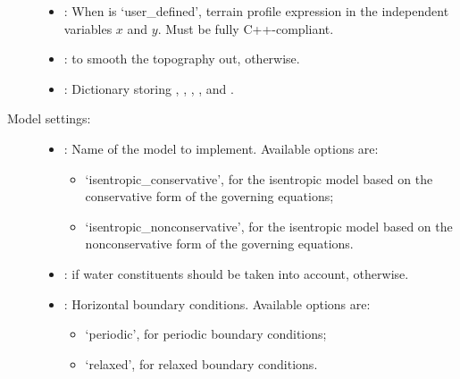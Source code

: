 \documentclass[letterpaper,10pt,english]{sphinxmanual}
\begin{document}
\begin{description}
\begin{itemize}
\item {} 
: When  is ‘user\_defined’, terrain profile             expression in the independent variables \(x\) and \(y\). Must be fully C++-compliant.

\item {} 
:  to smooth the topography out,  otherwise.

\item {} 
: Dictionary storing ,                , , ,          and .

\end{itemize}

\item[{Model settings:}] \leavevmode\begin{itemize}
\item {} 
: Name of the model to implement. Available options are:
\begin{itemize}
\item {} 
‘isentropic\_conservative’, for the isentropic model based on the conservative form                            of the governing equations;

\item {} 
‘isentropic\_nonconservative’, for the isentropic model based on the nonconservative form                              of the governing equations.

\end{itemize}

\item {} 
:  if water constituents should be taken into account,                  otherwise.

\item {} 
: Horizontal boundary conditions. Available options are:
\begin{itemize}
\item {} 
‘periodic’, for periodic boundary conditions;

\item {} 
‘relaxed’, for relaxed boundary conditions.

\end{itemize}

\end{itemize}


\end{description}
\end{document}
